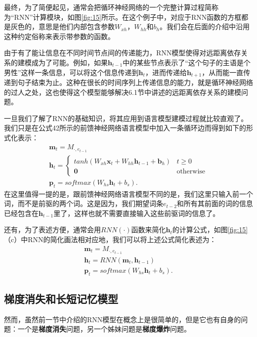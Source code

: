 \documentclass[10pt,a4paper]{ctexart}
\begin{document}
最终，为了简便起见，通常会把循环神经网络的一个完整计算过程简称为“RNN”计算模块，如图\ref{fig:15}所示。在这个例子中，对应于RNN函数的方框都是灰色的，意思是他们内部包含参数$W_{xh}$，$W_{hh}$和$b_h$。我们会在后面的介绍中沿用这种约定俗称来表示带参数的函数。

由于有了能让信息在不同时间节点间的传递能力，RNN模型使得对远距离依存关系的建模成为了可能。例如，如果$\textbf{h}_{t-1}$中的某些节点表示了“这个句子的主语是个男性”这样一条信息，可以将这个信息传递到$\textbf{h}_t$，进而传递给$\textbf{h}_{t+1}$，从而能一直传递到句子结束为止。这种在很长的时间序列上传递信息的能力，就是循环神经网络的过人之处，这也使得这个模型能够解决6.1节中讲述的远距离依存关系的建模问题。

一旦我们了解了RNN的基础知识，将其应用到语言模型建模过程就比较直观了\cite{mikolov2010recurrent}。我们只是在公式42所示的前馈神经网络语言模型中加入一条循环边而得到如下的形式化表示：
\[
 \begin{array}{l}
 \textbf{m}_t = M_{\cdot,e_{t-1}} \\
 \textbf{h}_t = \left\{ \begin{array}{ll}
  tanh(W_{xh}\textbf{x}_t + W_{hh}\textbf{h}_{t-1}+\textbf{b}_h) & t \geq 0 \\
  \textbf{0} & \textrm{otherwise}
  \end{array} \right. \\
 \textbf{p}_t = softmax(W_{hs}\textbf{h}_t + b_s).
 \end{array}
\]
在这里值得一提的是，跟前馈神经网络语言模型不同的是，我们这里只输入前一个词，而不是前驱的两个词。这是因为，我们期望词条$e_{t-2}$和所有其前面的词的信息已经包含在$\textbf{h}_{t-1}$里了，这样也就不需要直接输入这些前驱词的信息了。

还有，为了表述方便，通常会用$RNN(\cdot)$函数来简化$\textbf{h}_t$的计算公式，如图\ref{fig:15}（c）中RNN的简化画法相对应地，我们可以将上述公式简化表述为：
\[
 \begin{array}{l}
 \textbf{m}_t = M_{\cdot,e_{t-1}} \\
 \textbf{h}_t = RNN(\textbf{m}_t, \textbf{h}_{t-1}) \\
 \textbf{p}_t = softmax(W_{hs}\textbf{h}_t + b_s).
 \end{array}
\]

\subsection{梯度消失和长短记忆模型}
然而，虽然前一节中介绍的RNN模型在概念上是很简单的，但是它也有自身的问题：一个是\textbf{梯度消失}问题，另一个姊妹问题是\textbf{梯度爆炸}问题。
\end{document}
